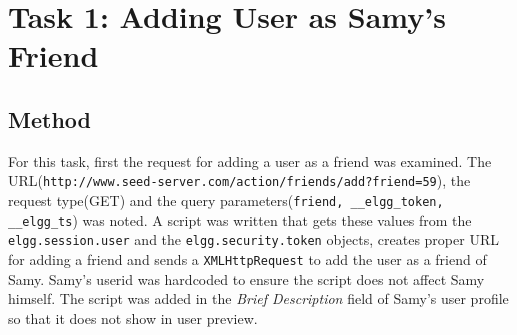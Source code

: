 \documentclass[a4paper, 11pt, oneside]{article} %
\begin{document}
\tableofcontents
\newpage

\section{Task 1: Adding User as Samy's Friend}
\subsection{Method}
For this task, first the request for adding a user as a friend was examined. The URL(\texttt{http://www.seed-server.com/action/friends/add?friend=59}), the request type(GET) and the query parameters(\texttt{friend, \_\_elgg\_token, \_\_elgg\_ts}) was noted. A script was written that gets these values from the \texttt{elgg.session.user} and the \texttt{elgg.security.token} objects, creates proper URL for adding a friend and sends a \texttt{XMLHttpRequest} to add the user as a friend of Samy. Samy's userid was hardcoded to ensure the script does not affect Samy himself. The script was added in the \textit{Brief Description} field of Samy's user profile so that it does not show in user preview.
\end{document}
